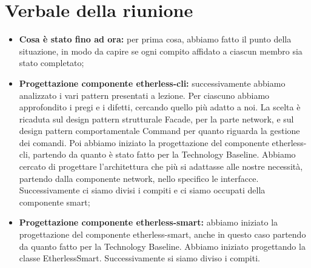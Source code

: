 \section{Verbale della riunione}
	\begin{itemize}
		\item \textbf{Cosa è stato fino ad ora:} per prima cosa, abbiamo fatto il punto della situazione, in modo da capire se ogni compito affidato a ciascun membro sia stato completato;
		\item \textbf{Progettazione componente etherless-cli:} successivamente abbiamo analizzato i vari pattern presentati a lezione. Per ciascuno abbiamo approfondito i pregi e i difetti, cercando quello più adatto a noi. La scelta è ricaduta sul design pattern strutturale Facade, per la parte network, e sul design pattern comportamentale Command per quanto riguarda la gestione dei comandi. Poi abbiamo iniziato la progettazione del componente etherless-cli, partendo da quanto è stato fatto per la Technology Baseline. Abbiamo cercato di progettare l'architettura che più si adattasse alle nostre necessità, partendo dalla componente network, nello specifico le interfacce. Successivamente ci siamo divisi i compiti e ci siamo occupati della componente smart;
		\item \textbf{Progettazione componente etherless-smart:} abbiamo  iniziato la progettazione del componente etherless-smart, anche in questo caso partendo da quanto fatto per la Technology Baseline. Abbiamo iniziato progettando la classe EtherlessSmart. Successivamente si siamo diviso i compiti.
	\end{itemize}